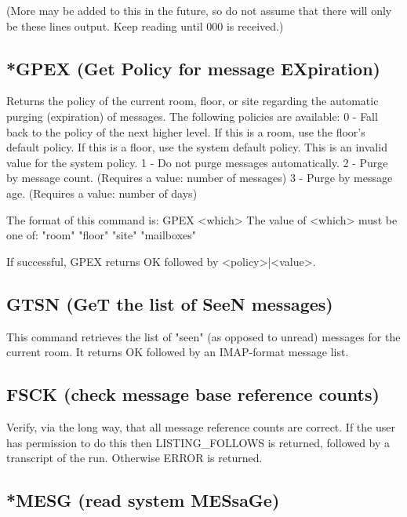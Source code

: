 (More may be added to this in the future, so do not assume that there will only
be these lines output. Keep reading until 000 is received.)



\subsection{*GPEX (Get Policy for message EXpiration)}

 Returns the policy of the current room, floor, or site regarding the automatic
purging (expiration) of messages.  The following policies are available:
   0  -  Fall back to the policy of the next higher level.  If this is a room,
         use the floor's default policy.  If this is a floor, use the system
         default policy.  This is an invalid value for the system policy.
   1  -  Do not purge messages automatically.
   2  -  Purge by message count.  (Requires a value: number of messages)
   3  -  Purge by message age.  (Requires a value: number of days)

 The format of this command is:  GPEX <which>
 The value of <which> must be one of: "room" "floor" "site" "mailboxes"

 If successful, GPEX returns OK followed by <policy>|<value>.



\subsection{GTSN (GeT the list of SeeN messages)}

 This command retrieves the list of "seen" (as opposed to unread) messages for
the current room.  It returns OK followed by an IMAP-format message list.



\subsection{FSCK (check message base reference counts)}

 Verify, via the long way, that all message reference counts are correct.  If
the user has permission to do this then LISTING_FOLLOWS is returned, followed
by a transcript of the run.  Otherwise ERROR is returned.



\subsection{*MESG (read system MESsaGe)}

